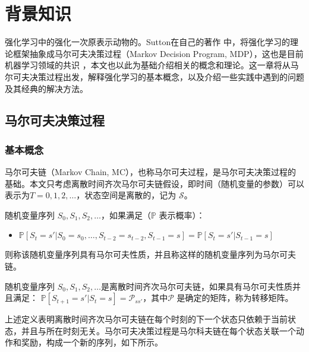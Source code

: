 
\chapter{背景知识}
\label{cha:background-knowledge}


强化学习中的强化一次原表示动物的。Sutton在自己的著作 \cite{suttonReinforcementLearningIntroduction2018}中，将强化学习的理论框架抽象成马尔可夫决策过程（Markov Decision Program, MDP），这也是目前机器学习领域的共识 \cite{mnihHumanlevelControlDeep2015} \cite{mnihAsynchronousMethodsDeep2016} \cite{hesselRainbowCombiningImprovements2018}  ，本文也以此为基础介绍相关的概念和理论。这一章将从马尔可夫决策过程出发，解释强化学习的基本概念，以及介绍一些实践中遇到的问题及其经典的解决方法。

\section{马尔可夫决策过程}
\subsection{基本概念}
马尔可夫链（Markov Chain, MC），也称马尔可夫过程，是马尔可夫决策过程的基础。本文只考虑离散时间齐次马尔可夫链假设，即时间（随机变量的参数）可以表示为$T = {0, 1, 2, \dots}$，状态空间是离散的，记为 $\mathcal{S}$。

\begin{definition}[马尔可夫链]
    随机变量序列 $S_0, S_1, S_2, \dots$，如果满足（$\mathbb{P}$ 表示概率）：
    \begin{itemize}
        \item[] $\mathbb{P} [S_{t} = s' |S_0 = s_0, \dots, S_{t-2} = s_{t-2}, S_{t-1} = s] = \mathbb{P} [S_{t} = s' | S_{t-1} = s]$
    \end{itemize}
    则称该随机变量序列具有马尔可夫性质，并且称这样的随机变量序列为马尔可夫链。
\end{definition}

\begin{definition}[离散时间齐次马尔可夫链]
    随机变量序列 $S_0, S_1, S_2, \dots$是离散时间齐次马尔可夫链，如果具有马尔可夫性质并且满足：
    $\mathbb{P} [S_{t+1} = s' | S_t = s] = \mathcal{P}_{ss'}$，其中$\mathcal{P}$ 是确定的矩阵，称为转移矩阵。
\end{definition}

上述定义表明离散时间齐次马尔可夫链在每个时刻的下一个状态只依赖于当前状态，并且与所在时刻无关。马尔可夫决策过程是马尔科夫链在每个状态关联一个动作和奖励，构成一个新的序列，如下所示。

